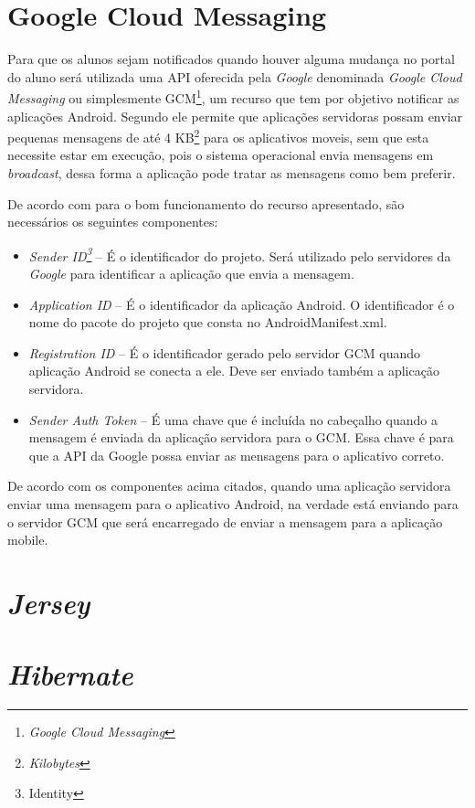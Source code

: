 \section{\textbf{Google Cloud 	Messaging}}

	\par Para que os alunos sejam notificados quando houver alguma mudança no
portal do aluno será utilizada uma API oferecida pela \textit{Google}
denominada \textit{Google Cloud Messaging} ou simplesmente
GCM\footnote{\textit{Google Cloud Messaging}}, um recurso que tem por objetivo
notificar as aplicações Android. Segundo  ele permite que
aplicações servidoras possam enviar pequenas mensagens de até 4
KB\footnote{\textit{Kilobytes}} para os aplicativos moveis, sem que esta
necessite estar em execução, pois o sistema operacional envia mensagens em
\textit{broadcast}, dessa forma a aplicação pode tratar as mensagens como bem
preferir.
	\par De acordo com  para o bom funcionamento do recurso
apresentado, são necessários os seguintes componentes:

\begin{itemize}
	
	\item \textit{Sender ID\footnote{Identity}} – É o identificador do projeto.
	Será utilizado pelo servidores da \textit{Google} para identificar a aplicação
	que envia a mensagem.
	
	\item \textit{Application ID} – É o identificador da aplicação Android. O
	identificador é o nome do pacote do projeto que consta no AndroidManifest.xml.
	
	\item \textit{Registration ID} – É o identificador gerado pelo servidor GCM
	quando aplicação Android se conecta a ele. Deve ser enviado também a aplicação
	servidora.
	
	\item \textit{Sender Auth Token} – É uma chave que é incluída no cabeçalho
	quando a mensagem é enviada da aplicação servidora para o GCM. Essa chave é
	para que a API da Google possa enviar as mensagens para o aplicativo correto.

\end{itemize}

	\par De acordo com os componentes acima citados, quando uma aplicação servidora
enviar uma mensagem para o aplicativo Android, na verdade está enviando para o
servidor GCM que será encarregado de enviar a mensagem para a aplicação mobile.
\section{\textit{Jersey}}
\section{\textit{Hibernate}}